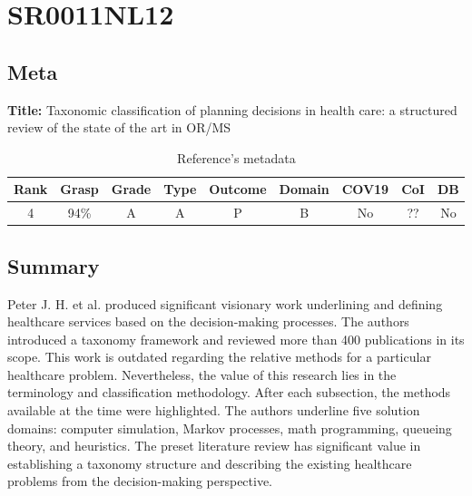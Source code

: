 \section{ SR0011NL12 }


\subsection{Meta}

    \textbf{Title:}
    Taxonomic classification of planning decisions in health care: a structured review of the state of the art in OR/MS

    \begin{table}[H]
        \centering
        \begin{tabular}{|c|c|c|c|c|c|c|c|c|}
            \hline
                \textbf{Rank} & \textbf{Grasp} & \textbf{Grade} & \textbf{Type} & \textbf{Outcome} & \textbf{Domain} & \textbf{COV19} & \textbf{CoI} & \textbf{DB} \\
            \hline
                4 & 94\% & A & A & P & B & No & ?? & No \\
            \hline
        \end{tabular}
        \caption{Reference's metadata}
        \label{tab:SR0011NL12}
    \end{table}

\subsection{Summary}
    Peter J. H. et al. produced significant visionary work underlining and defining healthcare services based on the decision-making processes. The authors introduced a taxonomy framework and reviewed more than 400 publications in its scope. This work is outdated regarding the relative methods for a particular healthcare problem. Nevertheless, the value of this research lies in the terminology and classification methodology. After each subsection, the methods available at the time were highlighted. The authors underline five solution domains: computer simulation, Markov processes, math programming, queueing theory, and heuristics. The preset literature review has significant value in establishing a taxonomy structure and describing the existing healthcare problems from the decision-making perspective.
    

